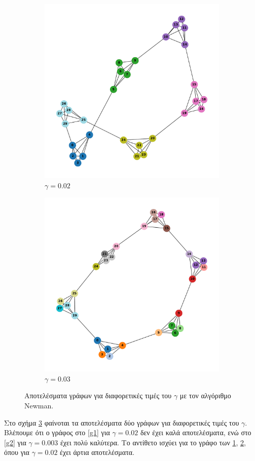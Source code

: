 \documentclass[12pt, letterpaper]{article}
\begin{document}
\begin{figure}
  \begin{subfigure}{0.5\textwidth}
    \centering
    \includegraphics[width=0.6\linewidth]{gammachange6,5gamma=0.02.pdf}
    \caption{$\gamma = 0.02$}
    \label{g3}
  \end{subfigure}
  \begin{subfigure}{0.5\textwidth}
    \centering
    \includegraphics[width=0.6\linewidth]{gammachange6,5gamma=0.04.pdf}
    \caption{$\gamma = 0.03$}
    \label{g4}
  \end{subfigure}


  \caption{Αποτελέσματα γράφων για διαφορετικές τιμές του $\gamma$
  με τον αλγόριθμο \textlatin{Newman}.}
  \label{gamma_tests}
\end{figure}







Στο σχήμα \ref{gamma_tests} φαίνοται τα αποτελέσματα δύο γράφων για διαφορετικές τιμές
του $\gamma$. Βλέπουμε ότι ο γράφος στο \ref{g1} για $\gamma = 0.02$ δεν έχει καλά 
αποτελέσματα, ενώ στο \ref{g2} για $\gamma = 0.003$ έχει πολύ καλύτερα. Το αντίθετο 
ισχύει για το γράφο των \ref{g3}, \ref{g4}, όπου για $\gamma = 0.02$ έχει άρτια αποτελέσματα.
\end{document}

